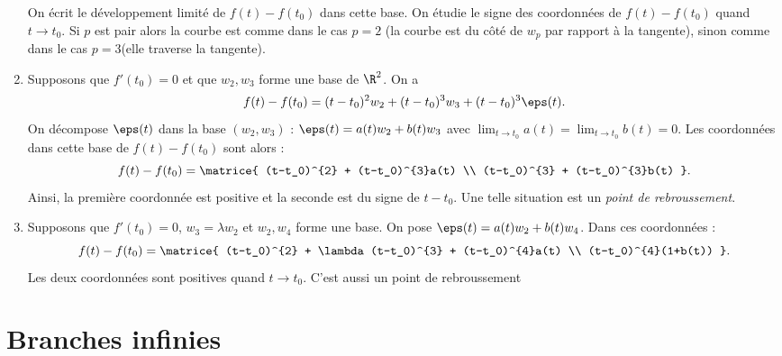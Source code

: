 \begin{enumerate}
On écrit le développement limité de $f(t)-f(t_0)$ dans cette base. On étudie le signe des coordonnées de $f(t)-f(t_0)$ quand $t\to t_0$. Si $p$ est pair alors la courbe est comme dans le cas $p=2$ (la courbe est du côté de $w_p$ par rapport à la tangente), sinon comme dans le cas $p=3 $(elle traverse la tangente).

\item Supposons que $f'(t_0) = 0$ et que $w_2,w_3$ forme une base de $\R^{2}$. On a \[f(t) - f(t_0) = (t-t_0)^{2}w_2 + (t-t_0)^{3}w_3 + (t-t_0)^{3}\eps(t).\]
On décompose $\eps(t)$ dans la base $(w_2,w_3)$ : $\eps(t)= a(t)w_2 + b(t)w_3$ avec $\lim_{t\to t_0}a(t) = \lim_{t\to t_0}b(t) = 0$. Les coordonnées dans cette base de $f(t)-f(t_0)$ sont alors : \[ f(t)-f(t_0) = \matrice{ (t-t_0)^{2} + (t-t_0)^{3}a(t) \\ (t-t_0)^{3} + (t-t_0)^{3}b(t) }. \]
Ainsi, la première coordonnée est positive et la seconde est du signe de $t-t_0$.
Une telle situation est un \textit{point de rebroussement}.

\item Supposons que $f'(t_0) = 0$, $w_3=\lambda w_2$ et $w_2,w_4$ forme une base. On pose $\eps(t) = a(t)w_2 + b(t)w_4$. Dans ces coordonnées : \[ f(t)-f(t_0) = \matrice{ (t-t_0)^{2} + \lambda (t-t_0)^{3} + (t-t_0)^{4}a(t) \\ (t-t_0)^{4}(1+b(t)) }.\]
Les deux coordonnées sont positives quand $t\to t_0$. C'est aussi un point de rebroussement
\end{enumerate}

\section{Branches infinies}


